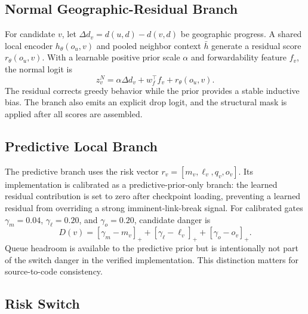 \documentclass{ieeeaccess}
\begin{document}
\subsection{Normal Geographic-Residual Branch}

For candidate $v$, let $\Delta d_v=d(u,d)-d(v,d)$ be geographic progress. A shared local encoder $h_\theta(o_u,v)$ and pooled neighbor context $\bar h$ generate a residual score $r_\theta(o_u,v)$. With a learnable positive prior scale $\alpha$ and forwardability feature $f_v$, the normal logit is
\begin{equation}
z^N_v=\alpha\Delta d_v+w_f^\top f_v+r_\theta(o_u,v).
\end{equation}
The residual corrects greedy behavior while the prior provides a stable inductive bias. The branch also emits an explicit drop logit, and the structural mask is applied after all scores are assembled.

\subsection{Predictive Local Branch}

The predictive branch uses the risk vector $r_v=[m_v,\ell_v,q_v,o_v]$. Its implementation is calibrated as a predictive-prior-only branch: the learned residual contribution is set to zero after checkpoint loading, preventing a learned residual from overriding a strong imminent-link-break signal. For calibrated gates $\gamma_m=0.04$, $\gamma_\ell=0.20$, and $\gamma_o=0.20$, candidate danger is
\begin{equation}
D(v)=[\gamma_m-m_v]_+ + [\gamma_\ell-\ell_v]_+ + [\gamma_o-o_v]_+.
\label{eq:danger}
\end{equation}
Queue headroom is available to the predictive prior but is intentionally not part of the switch danger in the verified implementation. This distinction matters for source-to-code consistency.

\subsection{Risk Switch}
\end{document}
